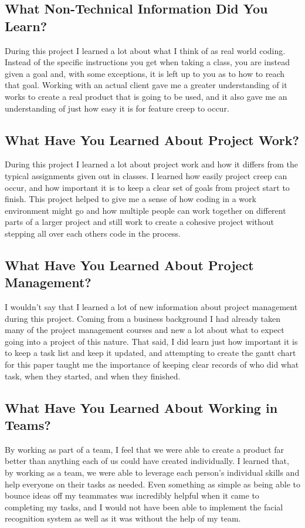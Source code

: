 \documentclass[10pt, onecolumn, twoside, peerreview]{IEEEtran}
\begin{document}
\subsection{What Non-Technical Information Did You Learn?}
During this project I learned a lot about what I think of as real world coding. Instead of the specific instructions you get when taking a class, you are instead given a goal and, with some exceptions, it is left up to you as to how to reach that goal. Working with an actual client gave me a greater understanding of it works to create a real product that is going to be used, and it also gave me an understanding of just how easy it is for feature creep to occur.

\subsection{What Have You Learned About Project Work?}
During this project I learned a lot about project work and how it differs from the typical assignments given out in classes. I learned how easily project creep can occur, and how important it is to keep a clear set of goals from project start to finish. This project helped to give me a sense of how coding in a work environment might go and how multiple people can work together on different parts of a larger project and still work to create a cohesive project without stepping all over each others code in the process.

\subsection{What Have You Learned About Project Management?}
I wouldn't say that I learned a lot of new information about project management during this project. Coming from a business background I had already taken many of the project management courses and new a lot about what to expect going into a project of this nature. That said, I did learn just how important it is to keep a task list and keep it updated, and attempting to create the gantt chart for this paper taught me the importance of keeping clear records of who did what task, when they started, and when they finished.

\subsection{What Have You Learned About Working in Teams?}
By working as part of a team, I feel that we were able to create a product far better than anything each of us could have created individually. I learned that, by working as a team, we were able to leverage each person's individual skills and help everyone on their tasks as needed. Even something as simple as being able to bounce ideas off my teammates was incredibly helpful when it came to completing my tasks, and I would not have been able to implement the facial recognition system as well as it was without the help of my team.
\end{document}
